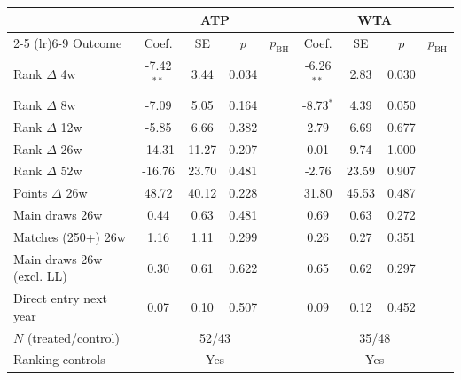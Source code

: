 \begin{tabular}{l cccc cccc}
\toprule
 & \multicolumn{4}{c}{ATP} & \multicolumn{4}{c}{WTA} \\
\cmidrule(lr){2-5} \cmidrule(lr){6-9}
Outcome & Coef. & SE & $p$ & $p_{\text{BH}}$ & Coef. & SE & $p$ & $p_{\text{BH}}$ \\
\midrule
Rank $\Delta$ 4w & -7.42$^{**}$ & 3.44 & 0.034 &  & -6.26$^{**}$ & 2.83 & 0.030 &  \\
Rank $\Delta$ 8w & -7.09 & 5.05 & 0.164 &  & -8.73$^{*}$ & 4.39 & 0.050 &  \\
Rank $\Delta$ 12w & -5.85 & 6.66 & 0.382 &  & 2.79 & 6.69 & 0.677 &  \\
Rank $\Delta$ 26w & -14.31 & 11.27 & 0.207 &  & 0.01 & 9.74 & 1.000 &  \\
Rank $\Delta$ 52w & -16.76 & 23.70 & 0.481 &  & -2.76 & 23.59 & 0.907 &  \\
Points $\Delta$ 26w & 48.72 & 40.12 & 0.228 &  & 31.80 & 45.53 & 0.487 &  \\
Main draws 26w & 0.44 & 0.63 & 0.481 &  & 0.69 & 0.63 & 0.272 &  \\
Matches (250+) 26w & 1.16 & 1.11 & 0.299 &  & 0.26 & 0.27 & 0.351 &  \\
Main draws 26w (excl. LL) & 0.30 & 0.61 & 0.622 &  & 0.65 & 0.62 & 0.297 &  \\
Direct entry next year & 0.07 & 0.10 & 0.507 &  & 0.09 & 0.12 & 0.452 &  \\
\midrule
$N$ (treated/control) & \multicolumn{4}{c}{52/43} & \multicolumn{4}{c}{35/48} \\
Ranking controls & \multicolumn{4}{c}{Yes} & \multicolumn{4}{c}{Yes} \\
\bottomrule
\end{tabular}
